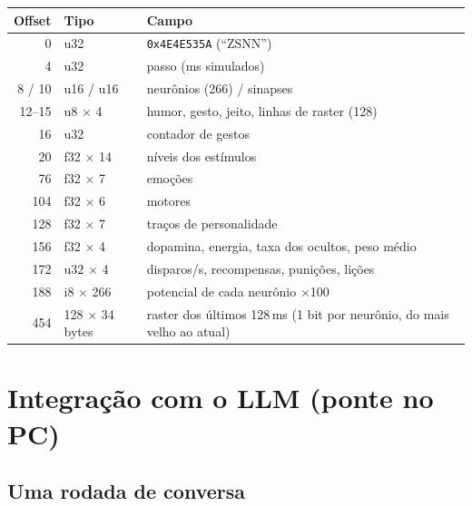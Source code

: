 \documentclass[11pt,a4paper]{article}
\begin{document}
\begin{center}
\small
\begin{tabular}{@{}rll@{}}
\toprule
Offset & Tipo & Campo \\
\midrule
0 & u32 & \texttt{0x4E4E535A} (“ZSNN”) \\
4 & u32 & passo (ms simulados) \\
8 / 10 & u16 / u16 & neurônios (266) / sinapses \\
12–15 & u8 $\times$ 4 & humor, gesto, jeito, linhas de raster (128) \\
16 & u32 & contador de gestos \\
20 & f32 $\times$ 14 & níveis dos estímulos \\
76 & f32 $\times$ 7 & emoções \\
104 & f32 $\times$ 6 & motores \\
128 & f32 $\times$ 7 & traços de personalidade \\
156 & f32 $\times$ 4 & dopamina, energia, taxa dos ocultos, peso médio \\
172 & u32 $\times$ 4 & disparos/s, recompensas, punições, lições \\
188 & i8 $\times$ 266 & potencial de cada neurônio $\times$100 \\
454 & 128 $\times$ 34 bytes & raster dos últimos 128\,ms (1 bit por neurônio, do mais velho ao atual) \\
\bottomrule
\end{tabular}
\end{center}

\section{Integração com o LLM (ponte no PC)}

\subsection{Uma rodada de conversa}
\end{document}
